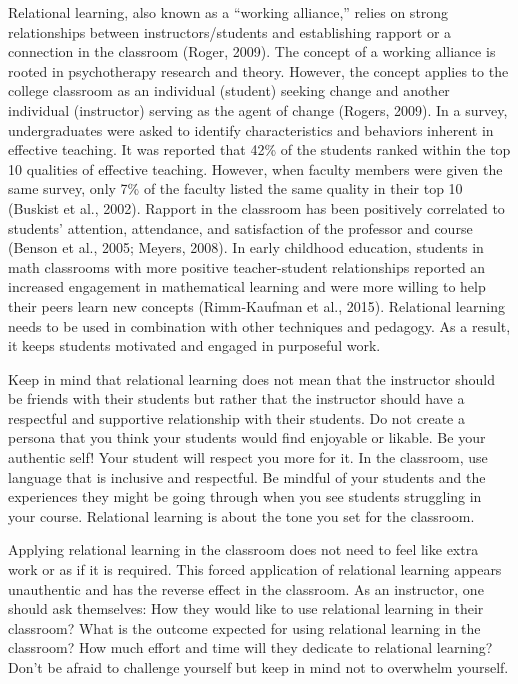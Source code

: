 \documentclass{book}
\begin{document}
Relational learning, also known as a ``working alliance,'' relies on strong
relationships between instructors/students and establishing rapport or a
connection in the classroom (Roger, 2009). The concept of a working alliance
is rooted in psychotherapy research and theory. However, the concept applies
to the college classroom as an individual (student) seeking change and another
individual (instructor) serving as the agent of change (Rogers, 2009). In a
survey, undergraduates were asked to identify characteristics and behaviors
inherent in effective teaching. It was reported that 42\% of the students
ranked within the top 10 qualities of effective teaching. However, when
faculty members were given the same survey, only 7\% of the faculty listed the
same quality in their top 10 (Buskist et al., 2002). Rapport in the classroom
has been positively correlated to students' attention, attendance, and
satisfaction of the professor and course (Benson et al., 2005; Meyers, 2008).
In early childhood education, students in math classrooms with more positive
teacher-student relationships reported an increased engagement in mathematical
learning and were more willing to help their peers learn new concepts
(Rimm-Kaufman et al., 2015). Relational learning needs to be used in
combination with other techniques and pedagogy. As a result, it keeps students
motivated and engaged in purposeful work.~

Keep in mind that relational learning does not mean that the instructor should
be friends with their students but rather that the instructor should have a
respectful and supportive relationship with their students. Do not create a
persona that you think your students would find enjoyable or likable. Be your
authentic self! Your student will respect you more for it. In the classroom,
use language that is inclusive and respectful. Be mindful of your students and
the experiences they might be going through when you see students struggling
in your course. Relational learning is about the tone you set for the
classroom.

Applying relational learning in the classroom does not need to feel like extra
work or as if it is required. This forced application of relational learning
appears unauthentic and has the reverse effect in the classroom. As an
instructor, one should ask themselves: How they would like to use relational
learning in their classroom? What is the outcome expected for using relational
learning in the classroom? How much effort and time will they dedicate to
relational learning? Don't be afraid to challenge yourself but keep in mind
not to overwhelm yourself.
\end{document}
